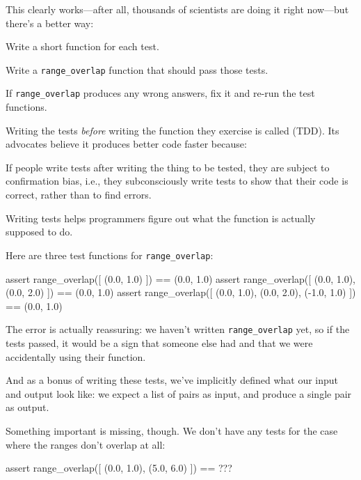 \documentclass{book}
\begin{document}
This clearly works---after all, thousands of scientists are doing it
right now---but there's a better way:

\begin{swcenumerate}
\item
  Write a short function for each test.
\item
  Write a \texttt{range\_overlap} function that should pass those tests.
\item
  If \texttt{range\_overlap} produces any wrong answers, fix it and
  re-run the test functions.
\end{swcenumerate}

Writing the tests \emph{before} writing the function they exercise is
called 
(TDD). Its advocates believe it produces better code faster because:

\begin{swcenumerate}
\item
  If people write tests after writing the thing to be tested, they are
  subject to confirmation bias, i.e., they subconsciously write tests to
  show that their code is correct, rather than to find errors.
\item
  Writing tests helps programmers figure out what the function is
  actually supposed to do.
\end{swcenumerate}

Here are three test functions for \texttt{range\_overlap}:

\begin{VerbIn}
assert range_overlap([ (0.0, 1.0) ]) == (0.0, 1.0)
assert range_overlap([ (0.0, 1.0), (0.0, 2.0) ]) == (0.0, 1.0)
assert range_overlap([ (0.0, 1.0), (0.0, 2.0), (-1.0, 1.0) ]) == (0.0, 1.0)
\end{VerbIn}

The error is actually reassuring: we haven't written
\texttt{range\_overlap} yet, so if the tests passed, it would be a sign
that someone else had and that we were accidentally using their
function.

And as a bonus of writing these tests, we've implicitly defined what our
input and output look like: we expect a list of pairs as input, and
produce a single pair as output.

Something important is missing, though. We don't have any tests for the
case where the ranges don't overlap at all:

\begin{VerbIn}
assert range_overlap([ (0.0, 1.0), (5.0, 6.0) ]) == ???
\end{VerbIn}
\end{document}
